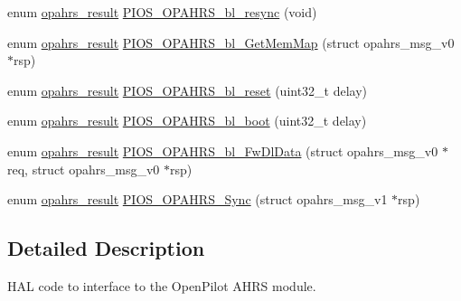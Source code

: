 \begin{DoxyCompactItemize}
\item 
enum \hyperlink{group___p_i_o_s___o_p_a_h_r_s_gaf6fe64d28ea92983e870494d0a5d05bd}{opahrs\-\_\-result} \hyperlink{group___p_i_o_s___o_p_a_h_r_s_gaa8bdcd7c130fd8eb142b9d211f87be2a}{\-P\-I\-O\-S\-\_\-\-O\-P\-A\-H\-R\-S\-\_\-bl\-\_\-resync} (void)
\item 
enum \hyperlink{group___p_i_o_s___o_p_a_h_r_s_gaf6fe64d28ea92983e870494d0a5d05bd}{opahrs\-\_\-result} \hyperlink{group___p_i_o_s___o_p_a_h_r_s_gad30305563d8e9e2ecb8bacaf203f17a3}{\-P\-I\-O\-S\-\_\-\-O\-P\-A\-H\-R\-S\-\_\-bl\-\_\-\-Get\-Mem\-Map} (struct opahrs\-\_\-msg\-\_\-v0 $\ast$rsp)
\item 
enum \hyperlink{group___p_i_o_s___o_p_a_h_r_s_gaf6fe64d28ea92983e870494d0a5d05bd}{opahrs\-\_\-result} \hyperlink{group___p_i_o_s___o_p_a_h_r_s_gaf2be915c98324c485c1a56d17472ddde}{\-P\-I\-O\-S\-\_\-\-O\-P\-A\-H\-R\-S\-\_\-bl\-\_\-reset} (uint32\-\_\-t delay)
\item 
enum \hyperlink{group___p_i_o_s___o_p_a_h_r_s_gaf6fe64d28ea92983e870494d0a5d05bd}{opahrs\-\_\-result} \hyperlink{group___p_i_o_s___o_p_a_h_r_s_ga5ef319e1098cc7338f56e9eea00ed761}{\-P\-I\-O\-S\-\_\-\-O\-P\-A\-H\-R\-S\-\_\-bl\-\_\-boot} (uint32\-\_\-t delay)
\item 
enum \hyperlink{group___p_i_o_s___o_p_a_h_r_s_gaf6fe64d28ea92983e870494d0a5d05bd}{opahrs\-\_\-result} \hyperlink{group___p_i_o_s___o_p_a_h_r_s_gadd69754c1b2e212326e33fb2209ae72e}{\-P\-I\-O\-S\-\_\-\-O\-P\-A\-H\-R\-S\-\_\-bl\-\_\-\-Fw\-Dl\-Data} (struct opahrs\-\_\-msg\-\_\-v0 $\ast$req, struct opahrs\-\_\-msg\-\_\-v0 $\ast$rsp)
\item 
enum \hyperlink{group___p_i_o_s___o_p_a_h_r_s_gaf6fe64d28ea92983e870494d0a5d05bd}{opahrs\-\_\-result} \hyperlink{group___p_i_o_s___o_p_a_h_r_s_gadbd0b219bada97964333612bc3394464}{\-P\-I\-O\-S\-\_\-\-O\-P\-A\-H\-R\-S\-\_\-\-Sync} (struct opahrs\-\_\-msg\-\_\-v1 $\ast$rsp)
\end{DoxyCompactItemize}


\subsection{\-Detailed \-Description}
\-H\-A\-L code to interface to the \-Open\-Pilot \-A\-H\-R\-S module. 

